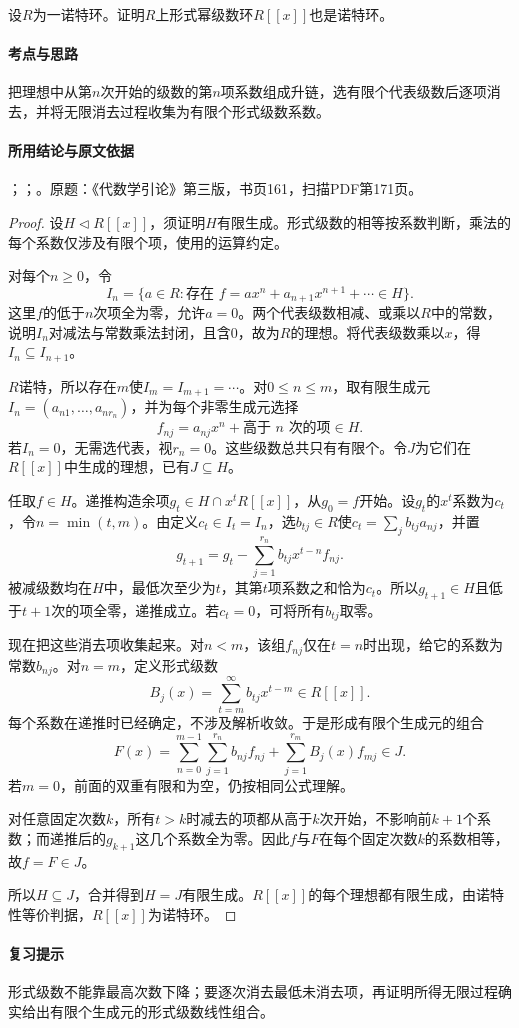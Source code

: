 设$R$为一诺特环。证明$R$上形式幂级数环$R[[x]]$也是诺特环。

\paragraph{考点与思路}

把理想中从第$n$次开始的级数的第$n$项系数组成升链，选有限个代表级数后逐项消去，并将无限消去过程收集为有限个形式级数系数。

\paragraph{所用结论与原文依据}

；；。原题：《代数学引论》第三版，书页161，扫描PDF第171页。


\begin{proof}

设$H\lhd R[[x]]$，须证明$H$有限生成。形式级数的相等按系数判断，乘法的每个系数仅涉及有限个项，使用的运算约定。

对每个$n\ge0$，令
\[
I_n=\{a\in R:\text{存在 }f=ax^n+a_{n+1}x^{n+1}+\cdots\in H\}.
\]
这里$f$的低于$n$次项全为零，允许$a=0$。两个代表级数相减、或乘以$R$中的常数，说明$I_n$对减法与常数乘法封闭，且含$0$，故为$R$的理想。将代表级数乘以$x$，得$I_n\subseteq I_{n+1}$。

$R$诺特，所以存在$m$使$I_m=I_{m+1}=\cdots$。对$0\le n\le m$，取有限生成元$I_n=(a_{n1},\ldots,a_{nr_n})$，并为每个非零生成元选择
\[
f_{nj}=a_{nj}x^n+\text{高于 }n\text{ 次的项}\in H.
\]
若$I_n=0$，无需选代表，视$r_n=0$。这些级数总共只有有限个。令$J$为它们在$R[[x]]$中生成的理想，已有$J\subseteq H$。

任取$f\in H$。递推构造余项$g_t\in H\cap x^tR[[x]]$，从$g_0=f$开始。设$g_t$的$x^t$系数为$c_t$，令$n=\min(t,m)$。由定义$c_t\in I_t=I_n$，选$b_{tj}\in R$使$c_t=\sum_j b_{tj}a_{nj}$，并置
\[
g_{t+1}=g_t-\sum_{j=1}^{r_n}b_{tj}x^{t-n}f_{nj}.
\]
被减级数均在$H$中，最低次至少为$t$，其第$t$项系数之和恰为$c_t$。所以$g_{t+1}\in H$且低于$t+1$次的项全零，递推成立。若$c_t=0$，可将所有$b_{tj}$取零。

现在把这些消去项收集起来。对$n<m$，该组$f_{nj}$仅在$t=n$时出现，给它的系数为常数$b_{nj}$。对$n=m$，定义形式级数
\[
B_j(x)=\sum_{t=m}^{\infty}b_{tj}x^{t-m}\in R[[x]].
\]
每个系数在递推时已经确定，不涉及解析收敛。于是形成有限个生成元的组合
\[
F(x)=\sum_{n=0}^{m-1}\sum_{j=1}^{r_n}b_{nj}f_{nj}
+\sum_{j=1}^{r_m}B_j(x)f_{mj}\in J.
\]
若$m=0$，前面的双重有限和为空，仍按相同公式理解。

对任意固定次数$k$，所有$t>k$时减去的项都从高于$k$次开始，不影响前$k+1$个系数；而递推后的$g_{k+1}$这几个系数全为零。因此$f$与$F$在每个固定次数$k$的系数相等，故$f=F\in J$。

所以$H\subseteq J$，合并得到$H=J$有限生成。$R[[x]]$的每个理想都有限生成，由诺特性等价判据，$R[[x]]$为诺特环。

\end{proof}

\paragraph{复习提示}

形式级数不能靠最高次数下降；要逐次消去最低未消去项，再证明所得无限过程确实给出有限个生成元的形式级数线性组合。
